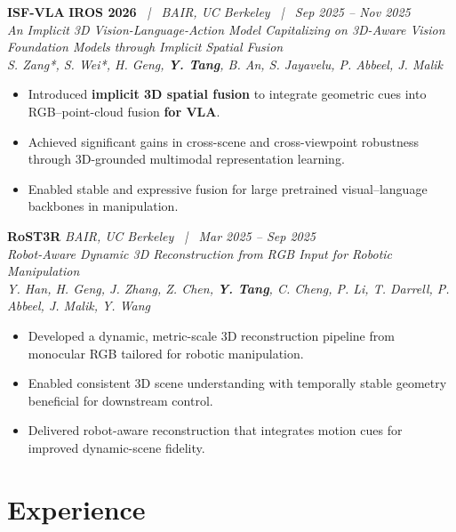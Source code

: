 \documentclass{chicv}
\begin{document}
\textbf{\large ISF-VLA} \hfill \textbf{IROS 2026} \textit{\ | \ BAIR, UC Berkeley \ | \ Sep 2025 -- Nov 2025} \\
\textit{\fontsize{9.5pt}{12pt}\selectfont An Implicit 3D Vision-Language-Action Model Capitalizing on 3D-Aware Vision Foundation Models through Implicit Spatial Fusion} \\
\textit{{\color{darkgray} S. Zang}*, {\color{darkgray} S. Wei}*, {\color{darkgray} H. Geng}, \textit{\textbf{Y. Tang}}, 
{\color{darkgray} B. An}, {\color{darkgray} S. Jayavelu}, {\color{darkgray} P. Abbeel}, {\color{darkgray} J. Malik}}
\begin{itemize}[noitemsep, topsep=0pt]
    \item Introduced \textbf{implicit 3D spatial fusion} to integrate geometric cues into RGB–point-cloud fusion \textbf{for VLA}.
    \item Achieved significant gains in cross-scene and cross-viewpoint robustness through 3D-grounded multimodal representation learning.
    \item Enabled stable and expressive fusion for large pretrained visual–language backbones in manipulation.
\end{itemize}
\textbf{\large RoST3R} \hfill \textit{BAIR, UC Berkeley \ | \ Mar 2025 -- Sep 2025} \\
\textit{\fontsize{9.5pt}{12pt}\selectfont Robot-Aware Dynamic 3D Reconstruction from RGB Input for Robotic Manipulation} \\
\textit{{\color{darkgray} Y. Han}, {\color{darkgray} H. Geng}, {\color{darkgray} J. Zhang}, 
{\color{darkgray} Z. Chen}, \textit{\textbf{Y. Tang}}, {\color{darkgray} C. Cheng}, 
{\color{darkgray} P. Li}, {\color{darkgray} T. Darrell}, {\color{darkgray} P. Abbeel}, 
{\color{darkgray} J. Malik}, {\color{darkgray} Y. Wang}}
\begin{itemize}[noitemsep, topsep=0pt]
    \item Developed a dynamic, metric-scale 3D reconstruction pipeline from monocular RGB tailored for robotic manipulation.
    \item Enabled consistent 3D scene understanding with temporally stable geometry beneficial for downstream control.
    \item Delivered robot-aware reconstruction that integrates motion cues for improved dynamic-scene fidelity.
\end{itemize}


\newpage
\section*{Experience}
\end{document}

